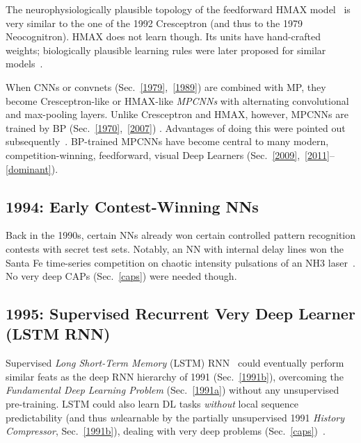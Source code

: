 \documentclass[letterpaper]{article}
\begin{document}
\begin{sloppypar}
The neurophysiologically plausible topology of the feedforward HMAX model~\citep{riesenhuber:1999} 
is very similar to the one of the 1992 Cresceptron (and thus to the 1979 Neocognitron).
HMAX does not learn though. Its units have hand-crafted weights; 
biologically plausible learning rules were later proposed for
similar models~\citep[e.g.,][]{serre2002,teichmann2012}.


When CNNs or convnets (Sec.~\ref{1979},~\ref{1989}) 
are combined with MP, they become Cresceptron-like or HMAX-like {\em MPCNNs} with
alternating convolutional and max-pooling layers. 
Unlike Cresceptron and HMAX, however, MPCNNs are trained by 
BP (Sec.~\ref{1970},~\ref{2007}) \citep{ranzato-cvpr-07}.
Advantages of doing this
were pointed out subsequently~\citep{scherer:2010}.
BP-trained MPCNNs 
have become
central to many modern, competition-winning, feedforward, visual Deep Learners (Sec.~\ref{2009},~\ref{2011}--\ref{dominant}). 



\subsection{1994: Early Contest-Winning NNs}
\label{1994}

Back in the 1990s, certain NNs already won certain 
controlled pattern recognition contests 
with secret test sets. Notably, 
an NN with internal delay lines 
 won the Santa Fe time-series competition on chaotic intensity 
pulsations of an NH3 laser~\citep{wan1994,weigend1993}.
No very deep CAPs (Sec.~\ref{caps}) were needed though. 


\subsection{1995: Supervised Recurrent Very Deep Learner (LSTM RNN)}
\label{1997}

Supervised {\em Long Short-Term Memory} (LSTM) RNN~\citep{lstm97and95,Gers:2000nc,Perez:02} 
could eventually perform similar feats as  the deep RNN hierarchy of 1991
(Sec.~\ref{1991b}),
overcoming the {\em Fundamental Deep Learning Problem} (Sec.~\ref{1991a}) without any unsupervised pre-training.
LSTM could also learn DL tasks {\em without} local sequence predictability (and thus 
{\em un}learnable by the partially 
unsupervised 1991 {\em History Compressor}, Sec.~\ref{1991b}), dealing with  
very deep problems (Sec.~\ref{caps})~\citep[e.g.,][]{Gers:02jmlr}.


\end{sloppypar}
\end{document}
